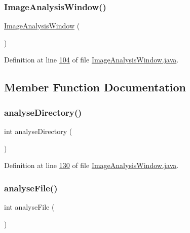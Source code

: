 \subsubsection{\texorpdfstring{Image\+Analysis\+Window()}{ImageAnalysisWindow()}}
{\footnotesize\ttfamily \hyperlink{classgui_1_1_image_analysis_window}{Image\+Analysis\+Window} (\begin{DoxyParamCaption}{ }\end{DoxyParamCaption})}



Definition at line \hyperlink{_image_analysis_window_8java_source_l00104}{104} of file \hyperlink{_image_analysis_window_8java_source}{Image\+Analysis\+Window.\+java}.



\subsection{Member Function Documentation}
\hypertarget{classgui_1_1_image_analysis_window_ac7ee842ae75372575a568d7026989b23}{}\label{classgui_1_1_image_analysis_window_ac7ee842ae75372575a568d7026989b23} 
\subsubsection{\texorpdfstring{analyse\+Directory()}{analyseDirectory()}}
{\footnotesize\ttfamily int analyse\+Directory (\begin{DoxyParamCaption}{ }\end{DoxyParamCaption})\hspace{0.3cm}{\ttfamily [private]}}



Definition at line \hyperlink{_image_analysis_window_8java_source_l00130}{130} of file \hyperlink{_image_analysis_window_8java_source}{Image\+Analysis\+Window.\+java}.

\hypertarget{classgui_1_1_image_analysis_window_a893a3a5beda8381306607568f3cff5f6}{}\label{classgui_1_1_image_analysis_window_a893a3a5beda8381306607568f3cff5f6} 
\subsubsection{\texorpdfstring{analyse\+File()}{analyseFile()}}
{\footnotesize\ttfamily int analyse\+File (\begin{DoxyParamCaption}{ }\end{DoxyParamCaption})\hspace{0.3cm}{\ttfamily [private]}}




